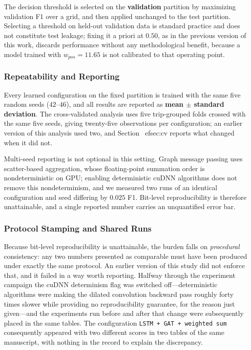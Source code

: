 \documentclass[journal]{IEEEtran}
\begin{document}
The decision threshold is selected on the \textbf{validation} partition by maximizing validation F1 over a grid, and then applied unchanged to the test partition. Selecting a threshold on held-out validation data is standard practice and does not constitute test leakage; fixing it a priori at $0.50$, as in the previous version of this work, discards performance without any methodological benefit, because a model trained with $w_{pos}=11.65$ is not calibrated to that operating point.

\subsubsection{Repeatability and Reporting}
\label{sec:repeatability}
Every learned configuration on the fixed partition is trained with the same five random seeds ($42$--$46$), and all results are reported as \textbf{mean $\pm$ standard deviation}. The cross-validated analysis uses five trip-grouped folds crossed with the same five seeds, giving twenty-five observations per configuration; an earlier version of this analysis used two, and Section~
ef{sec:cv} reports what changed when it did not.

Multi-seed reporting is not optional in this setting. Graph message passing uses scatter-based aggregation, whose floating-point summation order is nondeterministic on GPU; enabling deterministic cuDNN algorithms does not remove this nondeterminism, and we measured two runs of an identical configuration and seed differing by $0.025$ F1. Bit-level reproducibility is therefore unattainable, and a single reported number carries an unquantified error bar.

\subsubsection{Protocol Stamping and Shared Runs}
\label{sec:protocol_note}
Because bit-level reproducibility is unattainable, the burden falls on \emph{procedural} consistency: any two numbers presented as comparable must have been produced under exactly the same protocol. An earlier version of this study did not enforce that, and it failed in a way worth reporting. Halfway through the experiment campaign the cuDNN determinism flag was switched off---deterministic algorithms were making the dilated convolution backward pass roughly forty times slower while providing no reproducibility guarantee, for the reason just given---and the experiments run before and after that change were subsequently placed in the same tables. The configuration \texttt{LSTM + GAT + weighted sum} consequently appeared with two different scores in two tables of the same manuscript, with nothing in the record to explain the discrepancy.
\end{document}

